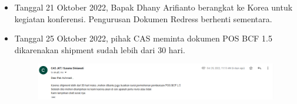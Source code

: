 \documentclass{article} %
\begin{document}
\begin{itemize}
		\newpage
		\item Tanggal 21 Oktober 2022, Bapak Dhany Arifianto berangkat ke Korea untuk kegiatan konferensi.
		Pengurusan Dokumen Redress berhenti sementara.
		
		\item Tanggal 25 Oktober 2022, pihak CAS meminta dokumen POS BCF 1.5 dikarenakan shipment sudah lebih dari 30 hari.
		
		\begin{figure}[!ht]
			\centering
			\includegraphics[width=400pt]{images/impor_15}
		\end{figure}
	
	\end{itemize}
\end{document}
